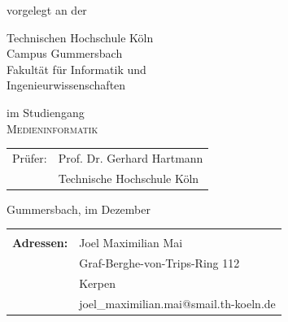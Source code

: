\begin{titlepage}
\begin{center}
\vspace{0.6cm}

\begin{large}
vorgelegt an der\\ 
\vspace{0.2cm}
\begin{scshape}
Technischen Hochschule Köln\\
Campus Gummersbach\\
Fakultät für Informatik und\\
Ingenieurwissenschaften\\
\end{scshape}
\end{large}

\vspace{0.6cm}

\begin{large}
im Studiengang\\ 
\vspace{0.1cm}
\textsc{Medieninformatik}
\end{large}


\vspace{1.2cm}

\begin{tabular}{rl}
        Prüfer:  &  Prof. Dr. Gerhard Hartmann\\
       					&  \small Technische Hochschule Köln \\[1.0em]
\end{tabular}

\vspace{1.2cm}

\begin{large}
Gummersbach, im Dezember \the\year
\end{large}

\end{center}

\newpage
\thispagestyle{empty}

\begin{center}
\begin{tabular}{rl}
							&  \\[26.0em]
							
\large \textbf{Adressen:}	&  	\quad Joel Maximilian Mai\\
							&  	\quad Graf-Berghe-von-Trips-Ring 112\\
							&	\quad 50169 Kerpen\\
							&  	\quad joel\_maximilian.mai@smail.th-koeln.de\\[2.0em]
							

\end{tabular}
\end{center}
\end{titlepage}
